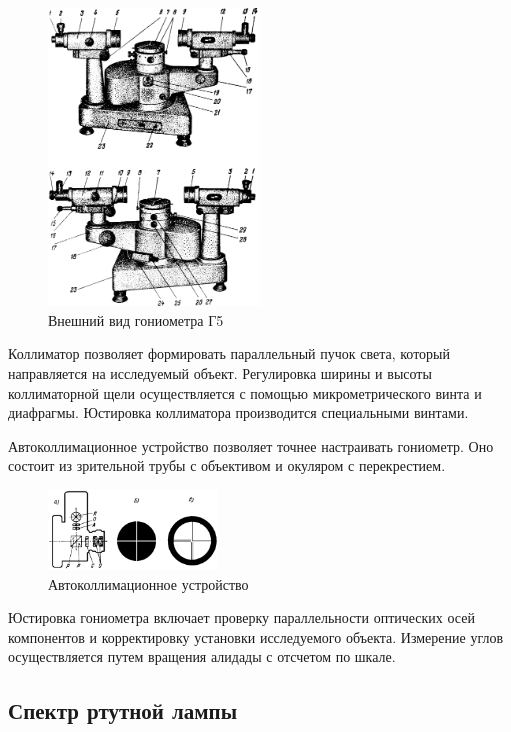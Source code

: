 \documentclass[a4paper,12pt]{article}
\begin{document}
\FloatBarrier
\begin{figure}[h]
    \centering
    \includegraphics[width=0.5\textwidth]{goniometer.png}
    \caption{Внешний вид гониометра Г5}
    \label{pic:goniometer}
\end{figure}
\FloatBarrier

Коллиматор позволяет формировать параллельный пучок света, который направляется на исследуемый объект. Регулировка ширины и высоты коллиматорной щели осуществляется с помощью микрометрического винта и диафрагмы. Юстировка коллиматора производится специальными винтами.

Автоколлимационное устройство позволяет точнее настраивать гониометр. Оно состоит из зрительной трубы с объективом и окуляром с перекрестием.

\FloatBarrier
\begin{figure}[h]
    \centering
    \includegraphics[width=0.4\textwidth]{autocollimat.png}
    \caption{Автоколлимационное устройство}
    \label{pic:autocollimat}
\end{figure}
\FloatBarrier

Юстировка гониометра включает проверку параллельности оптических осей компонентов и корректировку установки исследуемого объекта. Измерение углов осуществляется путем вращения алидады с отсчетом по шкале.

\subsection*{Спектр ртутной лампы}
\end{document}
